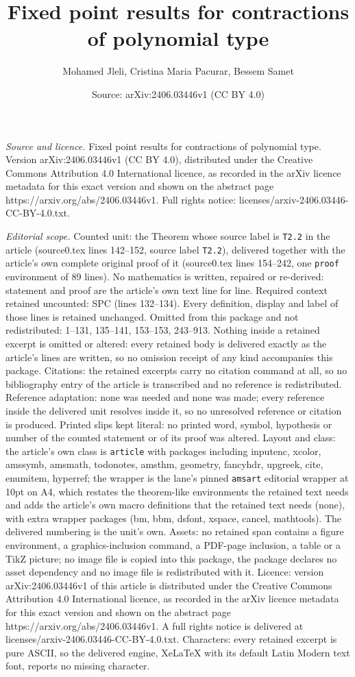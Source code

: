 \documentclass[10pt,a4paper]{amsart}
\title[Fixed point results for contractions of polynomial type]{Fixed point results for contractions of polynomial type}
\author{Mohamed Jleli, Cristina Maria Pacurar, Bessem Samet}
\date{Source: arXiv:2406.03446v1 (CC BY 4.0)}
\begin{document}
\maketitle

\noindent\emph{Source and licence.} Fixed point results for contractions of polynomial type. Version arXiv:2406.03446v1 (CC BY 4.0), distributed under the Creative Commons Attribution 4.0 International licence, as recorded in the arXiv licence metadata for this exact version and shown on the abstract page https://arxiv.org/abs/2406.03446v1. Full rights notice: licenses/arxiv-2406.03446-CC-BY-4.0.txt.\par\smallskip

\noindent\textit{Editorial scope.} Counted unit: the Theorem whose source label is \texttt{T2.2} in the article (source0.tex lines 142--152, source label \texttt{T2.2}), delivered together with the article's own complete original proof of it (source0.tex lines 154--242, one \texttt{proof} environment of 89 lines). No mathematics is written, repaired or re-derived: statement and proof are the article's own text line for line. Required context retained uncounted: SPC (lines 132--134). Every definition, display and label of those lines is retained unchanged. Omitted from this package and not redistributed: 1--131, 135--141, 153--153, 243--913. Nothing inside a retained excerpt is omitted or altered: every retained body is delivered exactly as the article's lines are written, so no omission receipt of any kind accompanies this package. Citations: the retained excerpts carry no citation command at all, so no bibliography entry of the article is transcribed and no reference is redistributed. Reference adaptation: none was needed and none was made; every reference inside the delivered unit resolves inside it, so no unresolved reference or citation is produced. Printed slips kept literal: no printed word, symbol, hypothesis or number of the counted statement or of its proof was altered. Layout and class: the article's own class is \texttt{article} with packages including inputenc, xcolor, amssymb, amsmath, todonotes, amsthm, geometry, fancyhdr, upgreek, cite, enumitem, hyperref; the wrapper is the lane's pinned \texttt{amsart} editorial wrapper at 10pt on A4, which restates the theorem-like environments the retained text needs and adds the article's own macro definitions that the retained text needs (none), with extra wrapper packages (bm, bbm, dsfont, xspace, cancel, mathtools). The delivered numbering is the unit's own. Assets: no retained span contains a figure environment, a graphics-inclusion command, a PDF-page inclusion, a table or a TikZ picture; no image file is copied into this package, the package declares no asset dependency and no image file is redistributed with it. Licence: version arXiv:2406.03446v1 of this article is distributed under the Creative Commons Attribution 4.0 International licence, as recorded in the arXiv licence metadata for this exact version and shown on the abstract page https://arxiv.org/abs/2406.03446v1. A full rights notice is delivered at licenses/arxiv-2406.03446-CC-BY-4.0.txt. Characters: every retained excerpt is pure ASCII, so the delivered engine, XeLaTeX with its default Latin Modern text font, reports no missing character.
\end{document}
